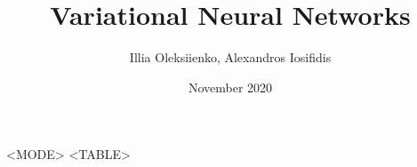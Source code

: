 \documentclass{article}
\title{Variational Neural Networks}
\author{Illia Oleksiienko, Alexandros Iosifidis}
\date{November 2020}
\begin{document}
\maketitle

\begin{center}
    \begin{tabular}{<MODE>}
    <TABLE>
    \end{tabular}
\end{center}
\end{document}
